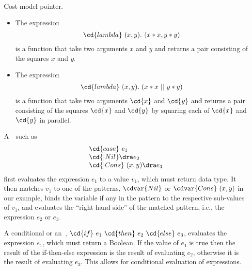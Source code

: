 \begin{teachnote}
Cost model pointer.
\end{teachnote}

\begin{example}

\begin{itemize}

\item

The expression 
\[
\begin{array}{l}
\cd{lambda}~(x, y).~(x * x, y * y)
\end{array}
\]
is a function that take two arguments $x$ and $y$ and returns a
pair consisting of the squares $x$ and $y$.
%

\item
The expression
\[
\begin{array}{l}
\cd{lambda}~(x, y).~(x * x~||~y * y)
\end{array}
\]
is a function that take two arguments $\cd{x}$ and $\cd{y}$ and returns a
pair consisting of the squares $\cd{x}$ and $\cd{y}$ by squaring each of
$\cd{x}$ and $\cd{y}$ in parallel.
\end{itemize}

\end{example}

\begin{gram}
A~~such as 
%
\[
\begin{array}{l}
\cd{case}~e_1 \\
\cd{| Nil}\dra e_2 \\ 
\cd{| Cons}~(x,y)\dra e_3 \\
\end{array}
\]
%
first evaluates the expression $e_1$ to a value $v_1$, which must
return data type.
%
It then matches $v_1$ to one of the patterns, $\cdvar{Nil}$ or
$\cdvar{Cons}~(x,y)$ in our example, binds the variable if any in the
pattern to the respective sub-values of $v_1$, and evaluates the
``right hand side'' of the matched pattern, i.e., the expression $e_2$
or $e_3$.
\end{gram}

\begin{gram}[Conditionals]
A conditional or an~,
$\cd{if}~e_1~\cd{then}~e_2~\cd{else}~e_3$, evaluates the expression $e_1$,
which must return a Boolean.
%
If the value of $e_1$ is true then the result of the if-then-else
expression is the result of evaluating $e_2$, otherwise it is the
result of evaluating $e_3$.  
%
This allows for conditional evaluation of expressions.
\end{gram}

